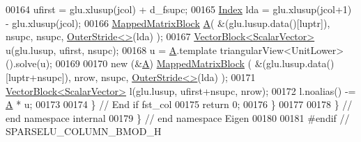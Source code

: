 \begin{DoxyCode}
00164     ufirst = glu.xlusup(jcol) + d\_fsupc; 
00165     \hyperlink{namespace_eigen_a62e77e0933482dafde8fe197d9a2cfde}{Index} lda = glu.xlusup(jcol+1) - glu.xlusup(jcol);
00166     \hyperlink{group___core___module_class_eigen_1_1_map}{MappedMatrixBlock} \hyperlink{group___core___module_class_eigen_1_1_matrix}{A}( &(glu.lusup.data()[luptr]), nsupc, nsupc, 
      \hyperlink{class_eigen_1_1_outer_stride}{OuterStride<>}(lda) );
00167     \hyperlink{group___core___module_class_eigen_1_1_vector_block}{VectorBlock<ScalarVector>} u(glu.lusup, ufirst, nsupc); 
00168     u = \hyperlink{group___core___module_class_eigen_1_1_matrix}{A}.template triangularView<UnitLower>().solve(u); 
00169     
00170     \textcolor{keyword}{new} (&\hyperlink{group___core___module_class_eigen_1_1_matrix}{A}) \hyperlink{group___core___module_class_eigen_1_1_map}{MappedMatrixBlock} ( &(glu.lusup.data()[luptr+nsupc]), nrow, nsupc, 
      \hyperlink{class_eigen_1_1_outer_stride}{OuterStride<>}(lda) );
00171     \hyperlink{group___core___module_class_eigen_1_1_vector_block}{VectorBlock<ScalarVector>} l(glu.lusup, ufirst+nsupc, nrow); 
00172     l.noalias() -= \hyperlink{group___core___module_class_eigen_1_1_matrix}{A} * u;
00173     
00174   \} \textcolor{comment}{// End if fst\_col}
00175   \textcolor{keywordflow}{return} 0; 
00176 \}
00177 
00178 \} \textcolor{comment}{// end namespace internal}
00179 \} \textcolor{comment}{// end namespace Eigen}
00180 
00181 \textcolor{preprocessor}{#endif // SPARSELU\_COLUMN\_BMOD\_H}
\end{DoxyCode}
